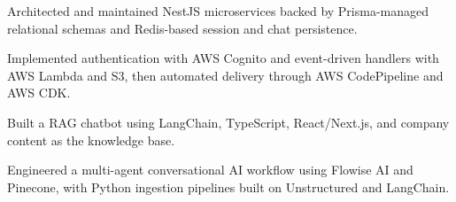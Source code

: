 \documentclass[letterpaper]{deedy-resume} %
\begin{document}
\begin{minipage}[t]{0.66\textwidth}






\vspace{\topsep} %
\begin{tightitemize}
  \item Architected and maintained NestJS microservices backed by Prisma-managed relational schemas and Redis-based session and chat persistence.
  \item Implemented authentication with AWS Cognito and event-driven handlers with AWS Lambda and S3, then automated delivery through AWS CodePipeline and AWS CDK.
  \item Built a RAG chatbot using LangChain, TypeScript, React/Next.js, and company content as the knowledge base.
  \item Engineered a multi-agent conversational AI workflow using Flowise AI and Pinecone, with Python ingestion pipelines built on Unstructured and LangChain.
\end{tightitemize}


\end{minipage}
\end{document}
